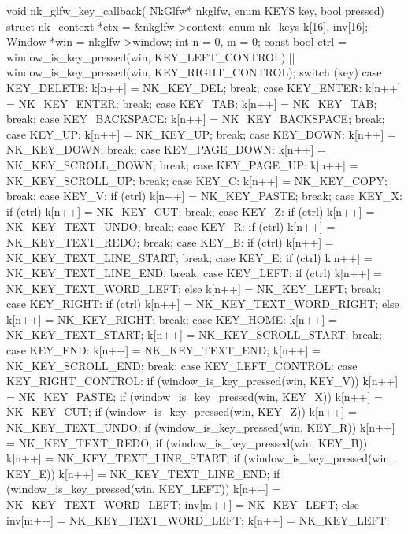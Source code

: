 \documentclass[14pt,a4paper]{extarticle}
\theoremstyle{definition}
\renewcommand{\[}{\begin{singlespace}\begin{equation*}}
\renewcommand{\]}{\end{equation*}\end{singlespace}}
\begin{document}
\begin{multicols}{2}
\begin{ccode}
void nk_glfw_key_callback(
        NkGlfw* nkglfw, enum KEYS key, bool pressed) {
    struct nk_context *ctx = &nkglfw->context;
    enum nk_keys k[16], inv[16];
    Window *win = nkglfw->window;
    int n = 0, m = 0;
    const bool ctrl =
            window_is_key_pressed(win, KEY_LEFT_CONTROL) ||
            window_is_key_pressed(win, KEY_RIGHT_CONTROL);
    switch (key) {
    case KEY_DELETE:      k[n++] = NK_KEY_DEL;             break;
    case KEY_ENTER:       k[n++] = NK_KEY_ENTER;           break;
    case KEY_TAB:         k[n++] = NK_KEY_TAB;             break;
    case KEY_BACKSPACE:   k[n++] = NK_KEY_BACKSPACE;       break;
    case KEY_UP:          k[n++] = NK_KEY_UP;              break;
    case KEY_DOWN:        k[n++] = NK_KEY_DOWN;            break;
    case KEY_PAGE_DOWN:   k[n++] = NK_KEY_SCROLL_DOWN;     break;
    case KEY_PAGE_UP:     k[n++] = NK_KEY_SCROLL_UP;       break;
    case KEY_C:           k[n++] = NK_KEY_COPY;            break;
    case KEY_V: if (ctrl) k[n++] = NK_KEY_PASTE;           break;
    case KEY_X: if (ctrl) k[n++] = NK_KEY_CUT;             break;
    case KEY_Z: if (ctrl) k[n++] = NK_KEY_TEXT_UNDO;       break;
    case KEY_R: if (ctrl) k[n++] = NK_KEY_TEXT_REDO;       break;
    case KEY_B: if (ctrl) k[n++] = NK_KEY_TEXT_LINE_START; break;
    case KEY_E: if (ctrl) k[n++] = NK_KEY_TEXT_LINE_END;   break;
    case KEY_LEFT:
        if (ctrl) k[n++] = NK_KEY_TEXT_WORD_LEFT;
        else k[n++] = NK_KEY_LEFT;
        break;
    case KEY_RIGHT:
        if (ctrl) k[n++] = NK_KEY_TEXT_WORD_RIGHT;
        else k[n++] = NK_KEY_RIGHT;
        break;
    case KEY_HOME:
        k[n++] = NK_KEY_TEXT_START; k[n++] = NK_KEY_SCROLL_START;
        break;
    case KEY_END:
        k[n++] = NK_KEY_TEXT_END;   k[n++] = NK_KEY_SCROLL_END;
        break;
    case KEY_LEFT_CONTROL:
    case KEY_RIGHT_CONTROL:
        if (window_is_key_pressed(win, KEY_V))
            k[n++] = NK_KEY_PASTE;
        if (window_is_key_pressed(win, KEY_X))
            k[n++] = NK_KEY_CUT;
        if (window_is_key_pressed(win, KEY_Z))
            k[n++] = NK_KEY_TEXT_UNDO;
        if (window_is_key_pressed(win, KEY_R))
            k[n++] = NK_KEY_TEXT_REDO;
        if (window_is_key_pressed(win, KEY_B))
            k[n++] = NK_KEY_TEXT_LINE_START;
        if (window_is_key_pressed(win, KEY_E))
            k[n++] = NK_KEY_TEXT_LINE_END;
        if (window_is_key_pressed(win, KEY_LEFT)) {
            k[n++] = NK_KEY_TEXT_WORD_LEFT;
            inv[m++] = NK_KEY_LEFT;
        } else {
            inv[m++] = NK_KEY_TEXT_WORD_LEFT;
            k[n++] = NK_KEY_LEFT;
}}}
\end{ccode}
\end{multicols}
\end{document}
